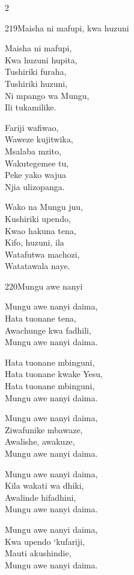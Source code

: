 \documentclass{article}
\begin{document}
\begin{multicols}{2}
\begin{hymn}{219}{Maisha ni mafupi, kwa huzuni}{}
\begin{stanza}
Maisha ni mafupi,\\
Kwa huzuni hupita,\\
Tushiriki furaha,\\
Tushiriki huzuni,\\
Ni mpango wa Mungu,\\
Ili tukamilike.
\end{stanza}
\begin{stanza}
Fariji wafiwao,\\
Waweze kujitwika,\\
Msalaba mzito,\\
Wakutegemee tu,\\
Peke yako wajua\\
Njia ulizopanga.
\end{stanza}
\begin{stanza}
Wako na Mungu juu,\\
Kushiriki upendo,\\
Kwao hakuna tena,\\
Kifo, huzuni, ila\\
Watafutwa machozi,\\
Watatawala naye.
\end{stanza}
\end{hymn}

\begin{hymn}{220}{Mungu awe nanyi}{}
\begin{stanza}
Mungu awe nanyi daima,\\
Hata tuonane tena,\\
Awachunge kwa fadhili,\\
Mungu awe nanyi daima.
\end{stanza}
\begin{chorus}
Hata tuonane mbinguni,\\
Hata tuonane kwake Yesu,\\
Hata tuonane mbinguni,\\
Mungu awe nanyi daima.
\end{chorus}
\begin{stanza}
Mungu awe nanyi daima,\\
Ziwafunike mbawaze,\\
Awalishe, awakuze,\\
Mungu awe nanyi daima.
\end{stanza}
\begin{stanza}
Mungu awe nanyi daima,\\
Kila wakati wa dhiki,\\
Awalinde hifadhini,\\
Mungu awe nanyi daima.
\end{stanza}
\begin{stanza}
Mungu awe nanyi daima,\\
Kwa upendo `kufariji,\\
Mauti akushindie,\\
Mungu awe nanyi daima.
\end{stanza}
\end{hymn}


\end{multicols}
\end{document}

